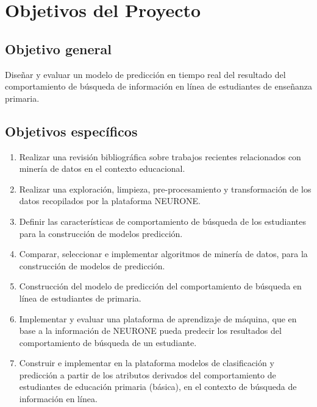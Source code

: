 
\chapter{Objetivos del Proyecto}
\label{ch:objetivos}
\setcounter{page}{1}
\section{Objetivo general}
\label{sec:objetivo-general}
Diseñar y evaluar un modelo de predicción en tiempo real del resultado del comportamiento de búsqueda de información en línea de estudiantes de enseñanza primaria.

\section{Objetivos específicos}
\label{subsec:objetivo-especificos}
\begin{enumerate}
	\item Realizar una revisión bibliográfica sobre trabajos recientes relacionados con minería de datos en el contexto educacional.
	\item Realizar una exploración, limpieza, pre-procesamiento y transformación de los datos recopilados por la plataforma NEURONE.
	\item Definir las características de comportamiento de búsqueda de los estudiantes para la construcción de modelos predicción.
	\item Comparar, seleccionar e implementar algoritmos de minería de datos, para la construcción de modelos de predicción.
	\item Construcción del modelo de predicción del comportamiento de búsqueda en línea de estudiantes de primaria.
	\item Implementar y evaluar una plataforma de aprendizaje de máquina, que en base a la información de NEURONE pueda predecir los resultados del comportamiento de búsqueda de un estudiante.
	\item Construir e implementar en la plataforma modelos de clasificación y predicción a partir de los atributos derivados del comportamiento de estudiantes de educación primaria (básica), en el contexto de búsqueda de información en línea.
\end{enumerate}